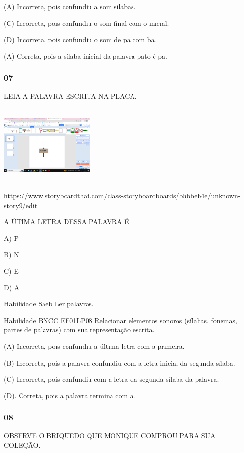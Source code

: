 \protect\hypertarget{_heading=h.19c6y18}{}{}(A) Incorreta, pois
confundiu a som silabas.

(C) Incorreta, pois confundiu o som final com o inicial.

(D) Incorreta, pois confundiu o som de pa com ba.

(A) Correta, pois a sílaba inicial da palavra pato é pa.

\subsubsection{07}\label{section-47}

LEIA A PALAVRA ESCRITA NA PLACA.

\includegraphics[width=1.83704in,height=1.58560in]{media/image216.png}

https://www.storyboardthat.com/class-storyboardboards/b5bbeb4e/unknown-story9/edit

A ÚTIMA LETRA DESSA PALAVRA É

A) P

B) N

C) E

D) A

Habilidade Saeb Ler palavras.

Habilidade BNCC EF01LP08 Relacionar elementos sonoros (sílabas, fonemas,
partes de palavras) com sua representação escrita.

(A) Incorreta, pois confundiu a última letra com a primeira.

(B) Incorreta, pois a palavra confundiu com a letra inicial da segunda
sílaba.

(C) Incorreta, pois confundiu com a letra da segunda sílaba da palavra.

(D). Correta, pois a palavra termina com a.

\subsubsection{08}\label{section-48}

OBSERVE O BRIQUEDO QUE MONIQUE COMPROU PARA SUA COLEÇÃO.

